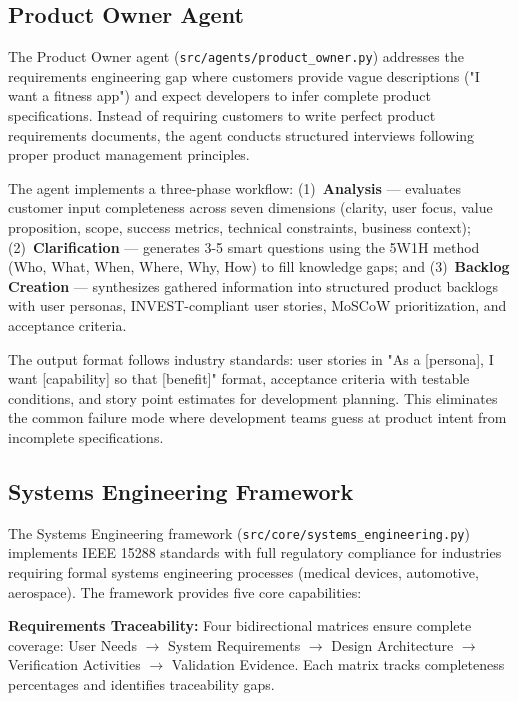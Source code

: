 \documentclass[11pt,a4paper]{article}
\begin{document}
\subsection{Product Owner Agent}
\label{sec:product-owner}

The Product Owner agent (\texttt{src/agents/product\_owner.py}) addresses the requirements engineering gap where customers provide vague descriptions ("I want a fitness app") and expect developers to infer complete product specifications. Instead of requiring customers to write perfect product requirements documents, the agent conducts structured interviews following proper product management principles.

The agent implements a three-phase workflow: (1)~\textbf{Analysis} --- evaluates customer input completeness across seven dimensions (clarity, user focus, value proposition, scope, success metrics, technical constraints, business context); (2)~\textbf{Clarification} --- generates 3-5 smart questions using the 5W1H method (Who, What, When, Where, Why, How) to fill knowledge gaps; and (3)~\textbf{Backlog Creation} --- synthesizes gathered information into structured product backlogs with user personas, INVEST-compliant user stories, MoSCoW prioritization, and acceptance criteria.

The output format follows industry standards: user stories in "As a [persona], I want [capability] so that [benefit]" format, acceptance criteria with testable conditions, and story point estimates for development planning. This eliminates the common failure mode where development teams guess at product intent from incomplete specifications.

\subsection{Systems Engineering Framework}
\label{sec:systems-engineering}

The Systems Engineering framework (\texttt{src/core/systems\_engineering.py}) implements IEEE 15288 standards with full regulatory compliance for industries requiring formal systems engineering processes (medical devices, automotive, aerospace). The framework provides five core capabilities:

\textbf{Requirements Traceability:} Four bidirectional matrices ensure complete coverage: User Needs $\rightarrow$ System Requirements $\rightarrow$ Design Architecture $\rightarrow$ Verification Activities $\rightarrow$ Validation Evidence. Each matrix tracks completeness percentages and identifies traceability gaps.
\end{document}
